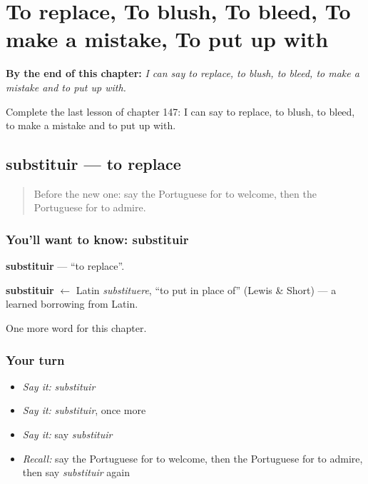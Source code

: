 
\chapter{To replace, To blush, To bleed, To make a mistake, To put up with}
\label{ch:pt-to-replace-to-blush-to-bleed-to-make-a-mistake-to-put-up-with}

\begin{chapteropening}
\textbf{By the end of this chapter:} \emph{I can say to replace, to blush, to bleed, to make a mistake and to put up with.}

Complete the last lesson of chapter 147: I can say to replace, to blush, to bleed, to make a mistake and to put up with.
\end{chapteropening}

\section[substituir]{substituir — to replace}

\label{lesson:PT-C147-substituir}



\begin{quote}
Before the new one: say the Portuguese for to welcome, then the Portuguese for to admire.
\end{quote}

\subsection*{You'll want to know: substituir}
\textbf{substituir} — \textquotedblleft{}to replace\textquotedblright{}.

\begin{cousinweb}
\textbf{substituir} $\leftarrow$ Latin \emph{substituere}, \textquotedblleft{}to put in place of\textquotedblright{} (Lewis \& Short) — a learned borrowing from Latin.
\end{cousinweb}

\begin{grammarlens}[title={What you've built}]
One more word for this chapter.
\end{grammarlens}

\subsection*{Your turn}
\begin{itemize}
\raggedright
  \item \emph{Say it:} \emph{substituir}
  \item \emph{Say it:} \emph{substituir}, once more
  \item \emph{Say it:} say \emph{substituir}
  \item \emph{Recall:} say the Portuguese for to welcome, then the Portuguese for to admire, then say \emph{substituir} again
\end{itemize}

